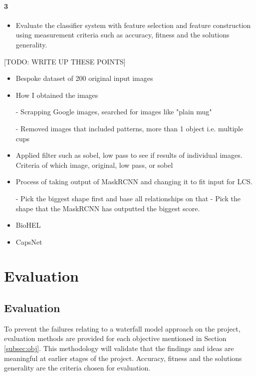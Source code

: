 \subsubsection{3}
\begin{itemize}
	\item Evaluate the classifier system with feature selection and feature construction using measurement criteria such as accuracy, fitness and the solution\textquotesingle s generality.
\end{itemize}

[TODO: WRITE UP THESE POINTS]
\begin{itemize}

	\item Bespoke dataset of 200 original input images
	\item  How I obtained the images
	  
	  - Scrapping Google images, searched for images like "plain mug"
	  
	  - Removed images that included patterns, more than 1 object i.e. multiple cups
	  
	 \item Applied filter such as sobel, low pass to see if results of individual images. Criteria of which image, original, low pass, or sobel
	 \item Process of taking output of MaskRCNN and changing it to fit input for LCS. 
	 
	 - Pick the biggest shape first and base all relationships on that
	 - Pick the shape that the MaskRCNN has outputted the biggest score.
	 \item BioHEL
	 \item CapsNet

\end{itemize}

\chapter{Evaluation}
\section{Evaluation} \label{sec:eval}
To prevent the failures relating to a waterfall model approach on the project, evaluation methods are provided for each objective mentioned in Section \ref{subsec:obj}. This methodology will validate that the findings and ideas are  meaningful at earlier stages of the project. Accuracy, fitness and the solution\textquotesingle s generality are the criteria chosen for evaluation.

